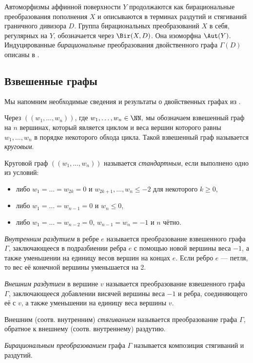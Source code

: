 Автоморфизмы аффинной поверхности $Y$ продолжаются как бирациональные преобразования пополнения $X$ и описываются в терминах раздутий и стягиваний граничного дивизора $D$. 
Группа бирациональных преобразований $X$ в себя, регулярных на $Y$, обозначается через $\Bir(X,D)$. Она изоморфна $\Aut(Y)$.
Индуцированные \emph{бирациональные} преобразования двойственного графа $\Gamma(D)$ описаны в \cite{FKZ07a}.

\subsection{Взвешенные графы}

Мы напомним необходимые сведения и результаты о двойственных графах из \cite{FKZ07a}.

\begin{definition}
Через $((w_1,\ldots,w_n))$, где $w_1,\ldots,w_n\in\NN,$ мы обозначаем взвешенный граф на $n$ вершинах, который является циклом и веса вершин которого равны $w_1,\ldots,w_n$ в порядке некоторого обхода цикла. Такой взвешенный граф называется \emph{круговым}.

Круговой граф  $((w_1,\ldots,w_n))$ называется \emph{стандартным}, если выполнено одно из условий:
\begin{itemize}
    \item либо $w_1=\ldots=w_{2k}=0$ и $w_{2k+1},\ldots,w_n\leqslant-2$ для некоторого $k\geqslant0$, 
    \item либо $w_1=\ldots=w_{n-1}=0$ и $w_n\leqslant0$,
    \item либо $w_1=\ldots=w_{n-2}=0$, $w_{n-1}=w_n=-1$ и $n$ чётно.
\end{itemize}
\end{definition}

\begin{definition}
\emph{Внутренним раздутием} в ребре $e$ называется преобразование взвешенного графа $\Gamma$, заключающееся в подразбиении ребра $e$ с помощью новой вершины веса $-1$, а также уменьшении на единицу весов вершин на концах $e$. Если ребро $e$ --- петля, то вес её конечной вершины уменьшается на 2.

\emph{Внешним раздутием} в вершине $v$ называется преобразование взвешенного графа $\Gamma$, заключающееся добавлении висячей вершины веса $-1$ и ребра, соединяющего её с $v$, а также уменьшении на единицу веса вершины $v$.

Внешним (соотв. внутренним) \emph{стягиванием} называется преобразование графа $\Gamma$, обратное к внешнему (соотв. внутреннему) раздутию.

\emph{Бирациональным преобразованием} графа $\Gamma$ называется композиция стягиваний и раздутий.
\end{definition}

